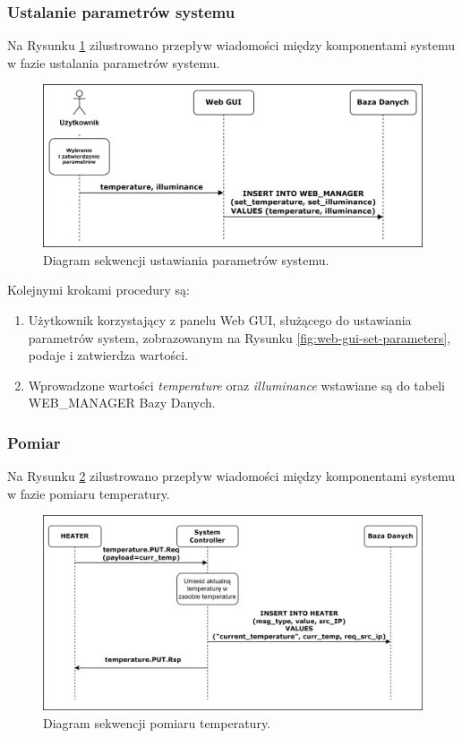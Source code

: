         \subsubsection{Ustalanie parametrów systemu}

            Na Rysunku \ref{fig:seq-user-webgui-db} zilustrowano przepływ wiadomości między komponentami systemu w fazie ustalania parametrów systemu.

            \begin{figure}[H]
                \centering
                \includegraphics[width=0.8\linewidth]{graphics/sequence-diagrams/user-webgui-db-diagram.png}
                \caption{Diagram sekwencji ustawiania parametrów systemu.}
                \label{fig:seq-user-webgui-db}
            \end{figure}

            Kolejnymi krokami procedury są:
            \begin{enumerate}
                \item Użytkownik korzystający z panelu Web GUI, służącego do ustawiania parametrów system, zobrazowanym na Rysunku \ref{fig:web-gui-set-parameters}, podaje i zatwierdza wartości.
                \item Wprowadzone wartości \textit{temperature} oraz \textit{illuminance} wstawiane są do tabeli WEB\_MANAGER Bazy Danych.
            \end{enumerate}

        \subsubsection{Pomiar}

            Na Rysunku \ref{fig:seq-heater-measure} zilustrowano przepływ wiadomości między komponentami systemu w fazie pomiaru temperatury.

            \begin{figure}[H]
                \centering
                \includegraphics[width=0.8\linewidth]{graphics/sequence-diagrams/heater-measure-seq.png}
                \caption{Diagram sekwencji pomiaru temperatury.}
                \label{fig:seq-heater-measure}
            \end{figure}

